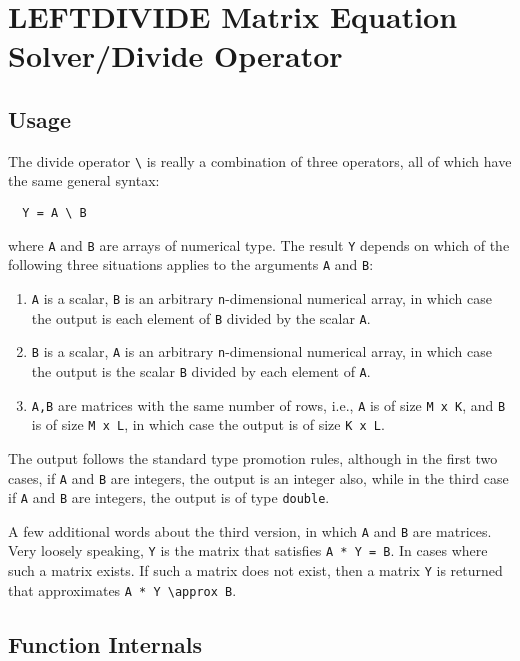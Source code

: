 \section{LEFTDIVIDE Matrix Equation Solver/Divide Operator}

\subsection{Usage}

The divide operator \verb|\| is really a combination of three
operators, all of which have the same general syntax:
\begin{verbatim}
  Y = A \ B
\end{verbatim}
where \verb|A| and \verb|B| are arrays of numerical type.  The result \verb|Y| depends
on which of the following three situations applies to the arguments
\verb|A| and \verb|B|:
\begin{enumerate}
\item  \verb|A| is a scalar, \verb|B| is an arbitrary \verb|n|-dimensional numerical array, in which case the output is each element of \verb|B| divided by the scalar \verb|A|.

\item  \verb|B| is a scalar, \verb|A| is an arbitrary \verb|n|-dimensional numerical array, in which case the output is the scalar \verb|B| divided by each element of \verb|A|.

\item  \verb|A,B| are matrices with the same number of rows, i.e., \verb|A| is of size \verb|M x K|, and \verb|B| is of size \verb|M x L|, in which case the output is of size \verb|K x L|.

\end{enumerate}
The output follows the standard type promotion rules, although in the first two cases, if \verb|A| and \verb|B| are integers, the output is an integer also, while in the third case if \verb|A| and \verb|B| are integers, the output is of type \verb|double|.

A few additional words about the third version, in which \verb|A| and \verb|B| are matrices.  Very loosely speaking, \verb|Y| is the matrix that satisfies \verb|A * Y = B|.  In cases where such a matrix exists.  If such a matrix does not exist, then a matrix \verb|Y| is returned that approximates \verb|A * Y \approx B|.
\subsection{Function Internals}

